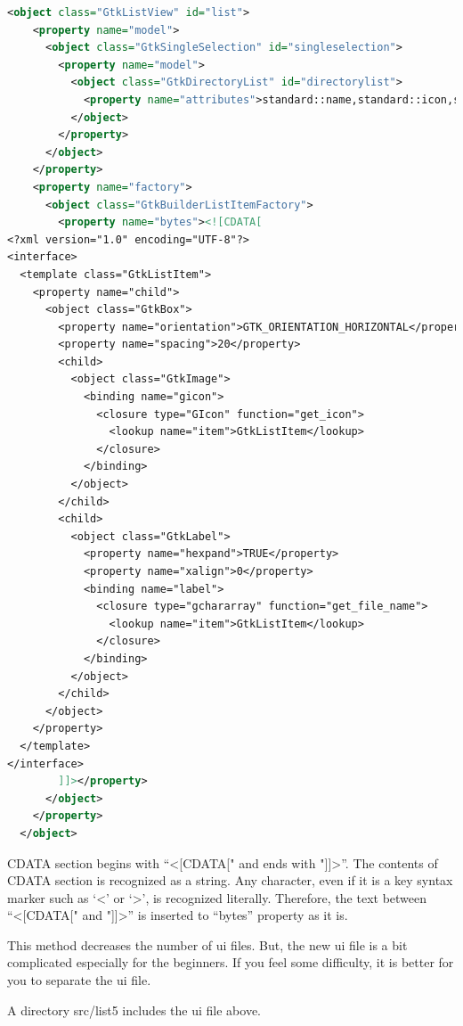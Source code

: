 \begin{lstlisting}[language=XML]
  <object class="GtkListView" id="list">
    <property name="model">
      <object class="GtkSingleSelection" id="singleselection">
        <property name="model">
          <object class="GtkDirectoryList" id="directorylist">
            <property name="attributes">standard::name,standard::icon,standard::content-type</property>
          </object>
        </property>
      </object>
    </property>
    <property name="factory">
      <object class="GtkBuilderListItemFactory">
        <property name="bytes"><![CDATA[
<?xml version="1.0" encoding="UTF-8"?>
<interface>
  <template class="GtkListItem">
    <property name="child">
      <object class="GtkBox">
        <property name="orientation">GTK_ORIENTATION_HORIZONTAL</property>
        <property name="spacing">20</property>
        <child>
          <object class="GtkImage">
            <binding name="gicon">
              <closure type="GIcon" function="get_icon">
                <lookup name="item">GtkListItem</lookup>
              </closure>
            </binding>
          </object>
        </child>
        <child>
          <object class="GtkLabel">
            <property name="hexpand">TRUE</property>
            <property name="xalign">0</property>
            <binding name="label">
              <closure type="gchararray" function="get_file_name">
                <lookup name="item">GtkListItem</lookup>
              </closure>
            </binding>
          </object>
        </child>
      </object>
    </property>
  </template>
</interface>
        ]]></property>
      </object>
    </property>
  </object>
\end{lstlisting}

CDATA section begins with ``\textless{[}CDATA{[}" and ends with
"{]}{]}\textgreater{}''. The contents of CDATA section is recognized as
a string. Any character, even if it is a key syntax marker such as
`\textless{}' or `\textgreater{}', is recognized literally. Therefore,
the text between ``\textless{[}CDATA{[}" and "{]}{]}\textgreater{}'' is
inserted to ``bytes'' property as it is.

This method decreases the number of ui files. But, the new ui file is a
bit complicated especially for the beginners. If you feel some
difficulty, it is better for you to separate the ui file.

A directory src/list5 includes the ui file above.
